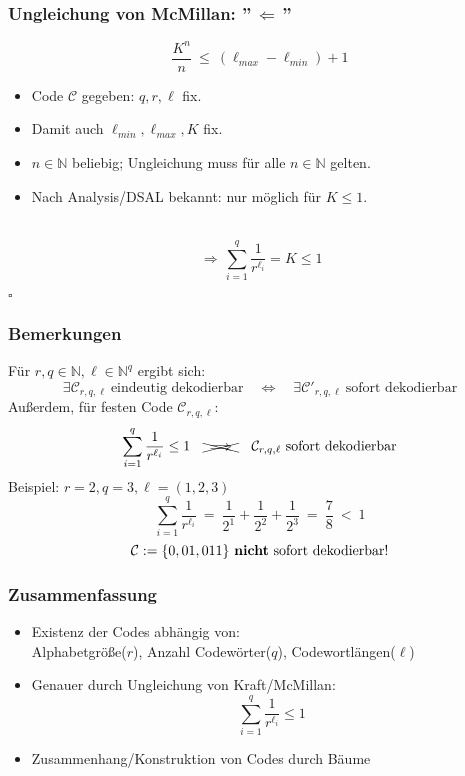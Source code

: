 \documentclass{beamer}
\begin{document}
\begin{frame}[t]
    \frametitle{Ungleichung von McMillan: ''$\,\Longleftarrow\,$''}
        $$
            \frac{K^n}{n}\ \leq\ (\ell_{max}-\ell_{min}) + 1
        $$
        \begin{itemize}
            \setlength\itemsep{1em}
            \item Code $\mathcal{C}$ gegeben: $q,r,\ell$ fix.
            \item Damit auch $\ell_{min},\ell_{max}, K$ fix.
            \pause
            \item $n \in \mathbb{N}$ beliebig; Ungleichung muss für alle $n \in \mathbb{N}$ gelten.
            \item Nach Analysis/DSAL bekannt: nur möglich für $K \leq 1$.
        \end{itemize}
        \strut\\
        $$
            \,\Longrightarrow\, \sum_{i=1}^{q} \frac{1}{r^{\ell_i}} = K \leq 1
        $$
        \strut\hfill$\square$
\end{frame}

\begin{frame}[t]
    \frametitle{Bemerkungen}
    Für $r,q \in \mathbb{N}, \ell \in \mathbb{N}^q$ ergibt sich:
    $$
        \exists \mathcal{C}_{r,q,\ell}\ \text{eindeutig dekodierbar}
        \quad\Longleftrightarrow\quad
        \exists \mathcal{C}'_{r,q,\ell}\ \text{sofort dekodierbar}
    $$
    \pause
    Außerdem, für festen Code $\mathcal{C}_{r,q,\ell}:$
    $$
        \sum_{i=1}^{q} \frac{1}{r^{\ell_i}} \leq 1
        \quad\xcancel{\large\ \Longrightarrow\ }\quad
        \mathcal{C}_{r,q,\ell}\ \text{sofort dekodierbar}
    $$
    \pause
    Beispiel: $r=2,q=3,\ell=(1,2,3)$
    $$
        \sum_{i=1}^{q} \frac{1}{r^{\ell_i}}
        \ =\ \frac{1}{2^1} + \frac{1}{2^2} + \frac{1}{2^3}
        \ =\ \frac{7}{8}
        \ <\ 1
    $$
    $$
        \mathcal{C} := \{0,01,011\}\ \text{\textbf{nicht} sofort dekodierbar!}
    $$
\end{frame}


\begin{frame}[t]
    \frametitle{Zusammenfassung}

    \begin{itemize}
        \setlength\itemsep{1em}
        \item Existenz der Codes abhängig von:\\
            Alphabetgröße($r$), Anzahl Codewörter($q$), Codewortlängen($\ell$)
        \item Genauer durch Ungleichung von Kraft/McMillan:
            $$
                \sum_{i=1}^{q} \frac{1}{r^{\ell_i}} \leq 1
            $$
        \item Zusammenhang/Konstruktion von Codes durch Bäume
    \end{itemize}

\end{frame}
\end{document}
